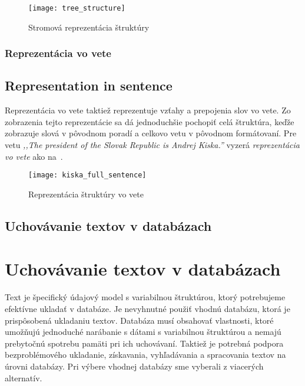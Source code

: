 \begin{figure}[H]
	\begin{center}\texttt{[image: tree\_structure]}\end{center}
	\caption[Stromová reprezentácia štruktúry]{Stromová reprezentácia štruktúry}\label{fig:tree_structure}
\end{figure}

%
%
{
	\subsubsection{Reprezentácia vo vete}
}
{
	\subsection{Representation in sentence}
}
\label{subsubsection:structure_representation_in_sentence}
Reprezentácia vo vete taktiež reprezentuje vzťahy a prepojenia slov vo vete. Zo zobrazenia tejto reprezentácie sa dá jednoduchšie pochopiť celá štruktúra, keďže zobrazuje slová v pôvodnom poradí a celkovo vetu v pôvodnom formátovaní. Pre vetu \textit{,,The president of the Slovak Republic is Andrej Kiska.''} vyzerá \textit{reprezentácia vo vete} ako na~.

\begin{figure}[H]
	\begin{center}\texttt{[image: kiska\_full\_sentence]}\end{center}
	\caption[Reprezentácia štruktúry vo vete]{Reprezentácia štruktúry vo vete}\label{fig:sentence_representation}
\end{figure}

%
%
{
	\subsection{Uchovávanie textov v databázach}
}
{
	\section{Uchovávanie textov v databázach}
}
\label{subsection:persisting_texts_in_db}
Text je špecifický údajový model s variabilnou štruktúrou, ktorý potrebujeme efektívne ukladať v databáze. Je nevyhnutné použiť vhodnú databázu, ktorá je prispôsobená ukladaniu textov. Databáza musí obsahovať vlastnosti, ktoré umožňujú jednoduché narábanie s dátami s variabilnou štruktúrou a nemajú prebytočnú spotrebu pamäti pri ich uchovávaní. Taktiež je potrebná podpora bezproblémového ukladanie, získavania, vyhľadávania a spracovania textov na úrovni databázy. Pri výbere vhodnej databázy sme vyberali z viacerých alternatív.


